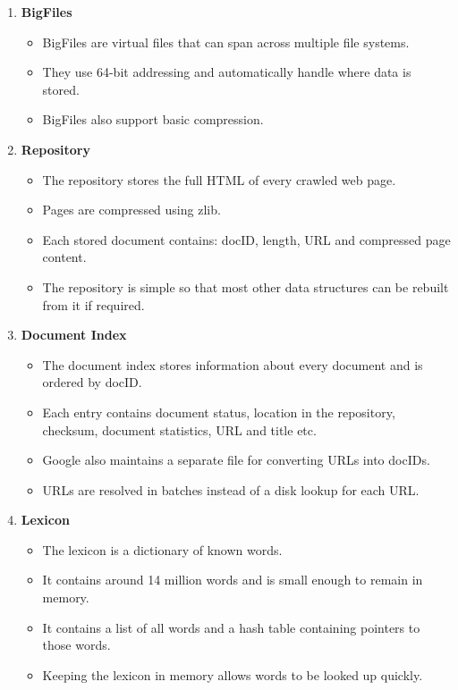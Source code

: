 \documentclass[10pt,a4paper]{article}
\begin{document}
\begin{enumerate}
    \item \textbf{BigFiles}
    \begin{itemize}
        \item BigFiles are virtual files that can span across multiple file systems.
        \item They use 64-bit addressing and automatically handle where data is stored.
        \item BigFiles also support basic compression.
    \end{itemize}

    \item \textbf{Repository}
    \begin{itemize}
        \item The repository stores the full HTML of every crawled web page.
        \item Pages are compressed using zlib.
        \item Each stored document contains: docID, length, URL and compressed page content.
        \item The repository is simple so that most other data structures can be rebuilt from it if required.
    \end{itemize}

    \item \textbf{Document Index}
    \begin{itemize}
        \item The document index stores information about every document and is ordered by docID.
        \item Each entry contains document status, location in the repository, checksum, document statistics, URL and title etc.
        \item Google also maintains a separate file for converting URLs into docIDs.
        \item URLs are resolved in batches instead of a disk lookup for each URL.
    \end{itemize}

    \item \textbf{Lexicon}
    \begin{itemize}
        \item The lexicon is a dictionary of known words.
        \item It contains around 14 million words and is small enough to remain in memory.
        \item It contains a list of all words and a hash table containing pointers to those words.
        \item Keeping the lexicon in memory allows words to be looked up quickly.
    \end{itemize}


\end{enumerate}
\end{document}
